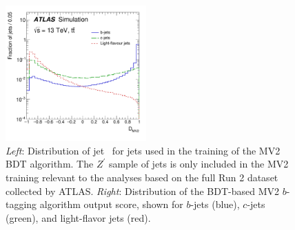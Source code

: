 \begin{figure}[!htb]
    \begin{center}
        \includegraphics[width=0.48\textwidth]{figures/chapter3/ftag/ftag_mv2c10_disc}
        \caption{
            \textit{Left}: Distribution of jet \pT~for jets used in the training of the MV2 BDT algorithm.
                The $Z^{\prime}$ sample of jets is only included in the MV2 training relevant to the analyses
                based on the full Run 2 dataset collected by ATLAS.
            \textit{Right}: Distribution of the BDT-based MV2 $b$-tagging algorithm output score, shown for
                $b$-jets (blue), $c$-jets (green), and light-flavor jets (red).
        }
        \label{fig:ftag_mv2c10_disc}
    \end{center}
\end{figure}



